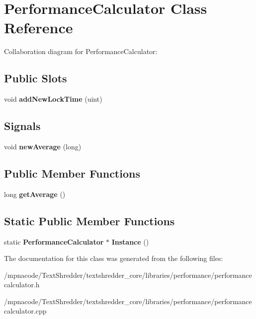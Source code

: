 \section{PerformanceCalculator Class Reference}
\label{class_performance_calculator}


Collaboration diagram for PerformanceCalculator:
\subsection*{Public Slots}
\begin{DoxyCompactItemize}
\item 
void {\bfseries addNewLockTime} (uint)\label{class_performance_calculator_a3c53e2b2ac46a779df8b44259796b923}

\end{DoxyCompactItemize}
\subsection*{Signals}
\begin{DoxyCompactItemize}
\item 
void {\bfseries newAverage} (long)\label{class_performance_calculator_ab6c79c61648b5f51aa4b391ba24053e7}

\end{DoxyCompactItemize}
\subsection*{Public Member Functions}
\begin{DoxyCompactItemize}
\item 
long {\bfseries getAverage} ()\label{class_performance_calculator_a01a51ce3574ec960e1c7d59ad59e9095}

\end{DoxyCompactItemize}
\subsection*{Static Public Member Functions}
\begin{DoxyCompactItemize}
\item 
static {\bf PerformanceCalculator} $\ast$ {\bfseries Instance} ()\label{class_performance_calculator_aaf82a436cf8c8971b927b2a62348a462}

\end{DoxyCompactItemize}


The documentation for this class was generated from the following files:\begin{DoxyCompactItemize}
\item 
/mpnacode/TextShredder/textshredder\_\-core/libraries/performance/performancecalculator.h\item 
/mpnacode/TextShredder/textshredder\_\-core/libraries/performance/performancecalculator.cpp\end{DoxyCompactItemize}
